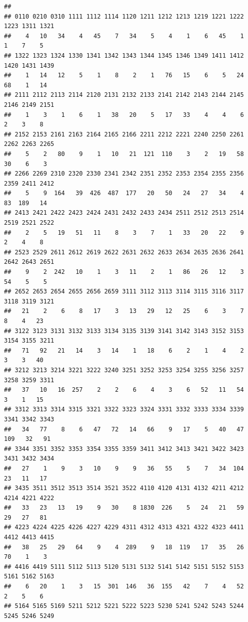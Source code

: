 \documentclass[
]{book}
\begin{document}
\begin{verbatim}
## 
## 0110 0210 0310 1111 1112 1114 1120 1211 1212 1213 1219 1221 1222 1223 1311 1321 
##    4   10   34    4   45    7   34    5    4    1    6   45    1    1    7    5 
## 1322 1323 1324 1330 1341 1342 1343 1344 1345 1346 1349 1411 1412 1420 1431 1439 
##    1   14   12    5    1    8    2    1   76   15    6    5   24   68    1   14 
## 2111 2112 2113 2114 2120 2131 2132 2133 2141 2142 2143 2144 2145 2146 2149 2151 
##    1    3    1    6    1   38   20    5   17   33    4    4    6    2    3    8 
## 2152 2153 2161 2163 2164 2165 2166 2211 2212 2221 2240 2250 2261 2262 2263 2265 
##    5    2   80    9    1   10   21  121  110    3    2   19   58   30    6    3 
## 2266 2269 2310 2320 2330 2341 2342 2351 2352 2353 2354 2355 2356 2359 2411 2412 
##    5    9  164   39  426  487  177   20   50   24   27   34    4   83  189   14 
## 2413 2421 2422 2423 2424 2431 2432 2433 2434 2511 2512 2513 2514 2519 2521 2522 
##    2    5   19   51   11    8    3    7    1   33   20   22    9    2    4    8 
## 2523 2529 2611 2612 2619 2622 2631 2632 2633 2634 2635 2636 2641 2642 2643 2651 
##    9    2  242   10    1    3   11    2    1   86   26   12    3   54    5    5 
## 2652 2653 2654 2655 2656 2659 3111 3112 3113 3114 3115 3116 3117 3118 3119 3121 
##   21    2    6    8   17    3   13   29   12   25    6    3    7    8    4   23 
## 3122 3123 3131 3132 3133 3134 3135 3139 3141 3142 3143 3152 3153 3154 3155 3211 
##   71   92   21   14    3   14    1   18    6    2    1    4    2    3    3   40 
## 3212 3213 3214 3221 3222 3240 3251 3252 3253 3254 3255 3256 3257 3258 3259 3311 
##   37   10   16  257    2    2    6    4    3    6   52   11   54    3    1   15 
## 3312 3313 3314 3315 3321 3322 3323 3324 3331 3332 3333 3334 3339 3341 3342 3343 
##   34   77    8    6   47   72   14   66    9   17    5   40   47  109   32   91 
## 3344 3351 3352 3353 3354 3355 3359 3411 3412 3413 3421 3422 3423 3431 3432 3434 
##   27    1    9    3   10    9    9   36   55    5    7   34  104   23   11   17 
## 3435 3511 3512 3513 3514 3521 3522 4110 4120 4131 4132 4211 4212 4214 4221 4222 
##   33   23   13   19    9   30    8 1830  226    5   24   21   59   29   27   81 
## 4223 4224 4225 4226 4227 4229 4311 4312 4313 4321 4322 4323 4411 4412 4413 4415 
##   38   25   29   64    9    4  289    9   18  119   17   35   26   70    1    3 
## 4416 4419 5111 5112 5113 5120 5131 5132 5141 5142 5151 5152 5153 5161 5162 5163 
##    6   20    1    3   15  301  146   36  155   42    7    4   52    2    5    6 
## 5164 5165 5169 5211 5212 5221 5222 5223 5230 5241 5242 5243 5244 5245 5246 5249 

\end{verbatim}
\end{document}

